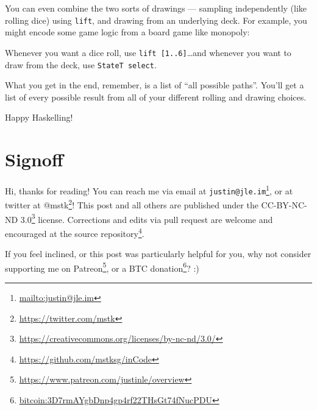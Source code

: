 \documentclass[]{article}
\newenvironment{Shaded}{}{}
\newcommand{\DataTypeTok}[1]{\textcolor[rgb]{0.56,0.13,0.00}{#1}}
\newcommand{\DecValTok}[1]{\textcolor[rgb]{0.25,0.63,0.44}{#1}}
\newcommand{\FunctionTok}[1]{\textcolor[rgb]{0.02,0.16,0.49}{#1}}
\newcommand{\KeywordTok}[1]{\textcolor[rgb]{0.00,0.44,0.13}{\textbf{#1}}}
\newcommand{\NormalTok}[1]{#1}
\newcommand{\OperatorTok}[1]{\textcolor[rgb]{0.40,0.40,0.40}{#1}}
\newcommand{\OtherTok}[1]{\textcolor[rgb]{0.00,0.44,0.13}{#1}}
\renewcommand{\href}[2]{#2\footnote{\url{#1}}}
\begin{document}
You can even combine the two sorts of drawings --- sampling independently (like
rolling dice) using \texttt{lift}, and drawing from an underlying deck. For
example, you might encode some game logic from a board game like monopoly:

\begin{Shaded}
\end{Shaded}

Whenever you want a dice roll, use \texttt{lift\ {[}1..6{]}}\ldots and whenever
you want to draw from the deck, use \texttt{StateT\ select}.

What you get in the end, remember, is a list of ``all possible paths''. You'll
get a list of every possible result from all of your different rolling and
drawing choices.

Happy Haskelling!

\hypertarget{signoff}{%
\section{Signoff}\label{signoff}}

Hi, thanks for reading! You can reach me via email at
\href{mailto:justin@jle.im}{\nolinkurl{justin@jle.im}}, or at twitter at
\href{https://twitter.com/mstk}{@mstk}! This post and all others are published
under the \href{https://creativecommons.org/licenses/by-nc-nd/3.0/}{CC-BY-NC-ND
3.0} license. Corrections and edits via pull request are welcome and encouraged
at \href{https://github.com/mstksg/inCode}{the source repository}.

If you feel inclined, or this post was particularly helpful for you, why not
consider \href{https://www.patreon.com/justinle/overview}{supporting me on
Patreon}, or a \href{bitcoin:3D7rmAYgbDnp4gp4rf22THsGt74fNucPDU}{BTC donation}?
:)
\end{document}
